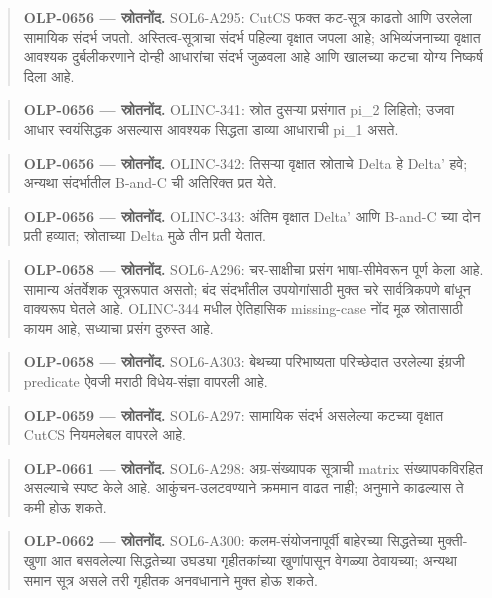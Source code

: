 \begin{quote}\small\textbf{OLP-0656 — स्रोतनोंद.} SOL6-A295: CutCS फक्त कट-सूत्र काढतो आणि उरलेला सामायिक संदर्भ जपतो. अस्तित्व-सूत्राचा संदर्भ पहिल्या वृक्षात जपला आहे; अभिव्यंजनाच्या वृक्षात आवश्यक दुर्बलीकरणाने दोन्ही आधारांचा संदर्भ जुळवला आहे आणि खालच्या कटचा योग्य निष्कर्ष दिला आहे.\end{quote}
\begin{quote}\small\textbf{OLP-0656 — स्रोतनोंद.} OLINC-341: स्रोत दुसऱ्या प्रसंगात pi\_2 लिहितो; उजवा आधार स्वयंसिद्धक असल्यास आवश्यक सिद्धता डाव्या आधाराची pi\_1 असते.\end{quote}
\begin{quote}\small\textbf{OLP-0656 — स्रोतनोंद.} OLINC-342: तिसऱ्या वृक्षात स्रोताचे Delta हे Delta' हवे; अन्यथा संदर्भातील B-and-C ची अतिरिक्त प्रत येते.\end{quote}
\begin{quote}\small\textbf{OLP-0656 — स्रोतनोंद.} OLINC-343: अंतिम वृक्षात Delta' आणि B-and-C च्या दोन प्रती हव्यात; स्रोताच्या Delta मुळे तीन प्रती येतात.\end{quote}
\begin{quote}\small\textbf{OLP-0658 — स्रोतनोंद.} SOL6-A296: चर-साक्षीचा प्रसंग भाषा-सीमेवरून पूर्ण केला आहे. सामान्य अंतर्वेशक सूत्ररूपात असतो; बंद संदर्भांतील उपयोगांसाठी मुक्त चरे सार्वत्रिकपणे बांधून वाक्यरूप घेतले आहे. OLINC-344 मधील ऐतिहासिक missing-case नोंद मूळ स्रोतासाठी कायम आहे, सध्याचा प्रसंग दुरुस्त आहे.\end{quote}
\begin{quote}\small\textbf{OLP-0658 — स्रोतनोंद.} SOL6-A303: बेथच्या परिभाष्यता परिच्छेदात उरलेल्या इंग्रजी predicate ऐवजी मराठी विधेय-संज्ञा वापरली आहे.\end{quote}
\begin{quote}\small\textbf{OLP-0659 — स्रोतनोंद.} SOL6-A297: सामायिक संदर्भ असलेल्या कटच्या वृक्षात CutCS नियमलेबल वापरले आहे.\end{quote}
\begin{quote}\small\textbf{OLP-0661 — स्रोतनोंद.} SOL6-A298: अग्र-संख्यापक सूत्राची matrix संख्यापकविरहित असल्याचे स्पष्ट केले आहे. आकुंचन-उलटवण्याने क्रममान वाढत नाही; अनुमाने काढल्यास ते कमी होऊ शकते.\end{quote}
\begin{quote}\small\textbf{OLP-0662 — स्रोतनोंद.} SOL6-A300: कलम-संयोजनापूर्वी बाहेरच्या सिद्धतेच्या मुक्ती-खुणा आत बसवलेल्या सिद्धतेच्या उघड्या गृहीतकांच्या खुणांपासून वेगळ्या ठेवायच्या; अन्यथा समान सूत्र असले तरी गृहीतक अनवधानाने मुक्त होऊ शकते.\end{quote}

